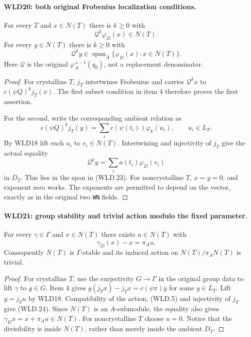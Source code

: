 \documentclass[11pt,a4paper]{article}
\numberwithin{equation}{section}
\theoremstyle{remark}\newtheorem{remark}[theorem]{Remark}
\begin{document}
\paragraph{WLD20: both original Frobenius localization conditions.}
\label{claim:WLD20}
For every $T$ and $x\in N(T)$ there is $k\ge0$ with
\[
                   \mathcal Q^k\varphi_D(x)\in N(T).
\]
For every $y\in N(T)$ there is $k\ge0$ with
\[
           \mathcal Q^ky\in
                  \operatorname{span}_A\{\varphi_D(x):x\in N(T)\}.
                                                               \tag{WLD.23}
\]
Here $\mathcal Q$ is the original
$\varphi_A^{\,s-1}(q_0)$, not a replacement denominator.

\begin{proof}
For crystalline $T$, $j_T$ intertwines Frobenius and carries
$\mathcal Q^kx$ to $c(\psi Q)^kj_T(x)$. The first subset
condition in item 4 therefore proves the first assertion.

For the second, write the corresponding ambient relation as
\[
 c(\psi Q)^kj_T(y)=
                 \sum_i c(\psi(t_i))\varphi_Y(u_i),
                         \qquad u_i\in L_T.
\]
By WLD18 lift each $u_i$ to $v_i\in N(T)$. Intertwining and
injectivity of $j_T$ give the actual equality
\[
                      \mathcal Q^ky=\sum_i a(t_i)\varphi_D(v_i)
\]
in $D_T$. This lies in the span in (WLD.23).
For noncrystalline $T$, $x=y=0$, and exponent zero works.
The exponents are permitted to depend on the vector, exactly
as in the original two \texttt{WN} fields.
\end{proof}

\paragraph{WLD21: group stability and trivial action modulo the fixed parameter.}
\label{claim:WLD21}
For every $\gamma\in\Gamma$ and $x\in N(T)$ there exists
$u\in N(T)$ with
\[
                        \gamma_D(x)-x=\pi_Au.             \tag{WLD.24}
\]
Consequently $N(T)$ is $\Gamma$-stable and its induced action
on $N(T)/\pi_A N(T)$ is trivial.

\begin{proof}
For crystalline $T$, use the surjectivity $G\to\Gamma$ in the
original group data to lift $\gamma$ to $g\in G$. Item 4 gives
$g(j_Tx)-j_Tx=c(\psi\pi)y$ for some $y\in L_T$.
Lift $y=j_Tu$ by WLD18. Compatibility of the action, (WLD.5)
and injectivity of $j_T$ give (WLD.24).
Since $N(T)$ is an $A$-submodule, the equality also gives
$\gamma_Dx=x+\pi_Au\in N(T)$.
For noncrystalline $T$ choose $u=0$. Notice that the divisibility
is inside $N(T)$, rather than merely inside the ambient $D_T$.
\end{proof}
\end{document}
